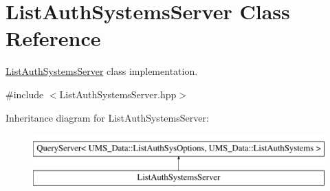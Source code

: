 \hypertarget{classListAuthSystemsServer}{
\section{ListAuthSystemsServer Class Reference}
\label{classListAuthSystemsServer}
}


\hyperlink{classListAuthSystemsServer}{ListAuthSystemsServer} class implementation.  




{\ttfamily \#include $<$ListAuthSystemsServer.hpp$>$}

Inheritance diagram for ListAuthSystemsServer:\begin{figure}[H]
\begin{center}
\leavevmode
\includegraphics[height=2.000000cm]{classListAuthSystemsServer}
\end{center}
\end{figure}
